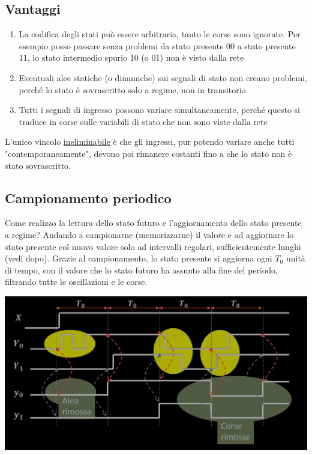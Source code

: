 \documentclass{article}
\begin{document}
\subsection{Vantaggi}
\begin{enumerate}
    \item La codifica degli stati può essere arbitraria, tanto le corse sono ignorate. Per esempio posso passare senza problemi da stato presente 00 a stato presente 11, lo stato intermedio spurio 10 (o 01) non è visto dalla rete
    \item Eventuali alee statiche (o dinamiche) sui segnali di stato non creano problemi, perché lo stato è sovrascritto solo a regime, non in transitorio
    \item Tutti i segnali di ingresso possono variare simultaneamente, perché questo si traduce in corse sulle variabili di stato che non sono viste dalla rete
\end{enumerate}
L’unico vincolo \underline{ineliminabile} è che gli ingressi, pur potendo variare anche tutti "contemporaneamente", devono poi rimanere costanti fino a che lo stato non è stato sovrascritto.
\subsection{Campionamento periodico}
Come realizzo la lettura dello stato futuro e l’aggiornamento dello stato presente a regime? Andando a campionarne (memorizzarne) il valore e ad aggiornare lo stato presente col nuovo valore solo ad intervalli regolari, sufficientemente lunghi (vedi dopo). Grazie al campionamento, lo stato presente si aggiorna ogni $T_0$ unità di tempo, con il valore che lo stato futuro ha assunto alla fine del periodo, filtrando tutte le oscillazioni e le corse.
\begin{center}
    \includegraphics[scale=0.38]{campionamento periodico.png}
\end{center}
\end{document}
